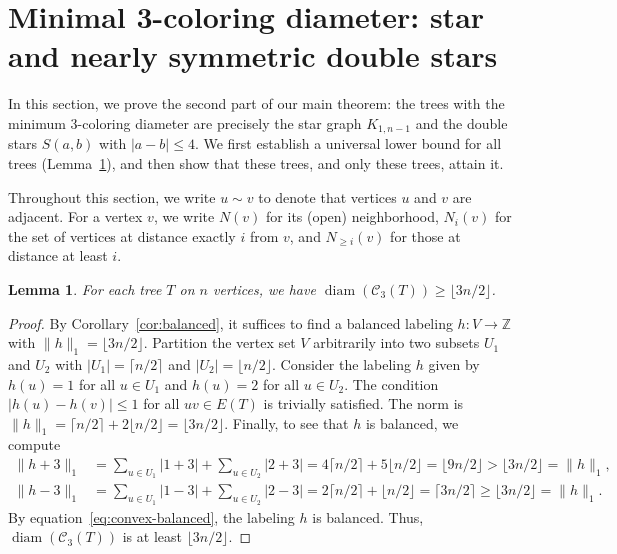 \documentclass[12pt,reqno]{amsart}
\newtheorem{lem}[thm]{Lemma}
\theoremstyle{definition}
\newcommand{\C}{\mathcal{C}}
\newcommand{\Z}{\mathbb{Z}}
\newcommand{\diam}{\operatorname{diam}}
\begin{document}
\section{Minimal 3-coloring diameter: star and nearly symmetric double stars}\label{sec:minimum-3-coloring-diameter}

In this section, we prove the second part of our main theorem: the trees with the minimum 3-coloring diameter are precisely the star graph $K_{1, n-1}$ and the double stars $S(a, b)$ with $|a-b| \le 4$. We first establish a universal lower bound for all trees (Lemma~\ref{lem:universal-lower-bound}), and then show that these trees, and only these trees, attain it.

Throughout this section, we write $u\sim v$ to denote that vertices $u$ and $v$ are adjacent. For a vertex $v$, we write $N(v)$ for its (open) neighborhood, 
$N_i(v)$ for the set of vertices at distance exactly $i$ from $v$, 
and $N_{\ge i}(v)$ for those at distance at least $i$.
 

\begin{lem}\label{lem:universal-lower-bound}
For each tree $T$ on $n$ vertices, we have $\diam(\C_3(T))\geq \lfloor 3n/2\rfloor$.
\end{lem}

\begin{proof} By Corollary~\ref{cor:balanced}, it suffices to find a balanced labeling $h\colon V\to \Z$ with $\|h\|_1 = \lfloor 3n/2\rfloor$. Partition the vertex set $V$ arbitrarily into two subsets $U_1$ and $U_2$ with $|U_1|=\lceil n/2 \rceil$ and $|U_2|=\lfloor n/2 \rfloor$. Consider the labeling $h$ given by $h(u)=1$ for all $u\in U_1$ and $h(u)=2$ for all $u\in U_2$. The condition $|h(u)-h(v)|\leq 1$ for all $uv\in E(T)$ is trivially satisfied. The norm is $\|h\|_1=\lceil n/2\rceil + 2 \lfloor n/2\rfloor = \lfloor 3n/2\rfloor$. Finally, to see that $h$ is balanced, we compute
\begin{align*}
\|h+3\|_1 &= \sum_{u\in U_1} |1+3| + \sum_{u\in U_2} |2+3| = 4\lceil n/2\rceil + 5\lfloor n/2\rfloor = \lfloor 9n/2 \rfloor > \lfloor 3n/2\rfloor = \|h\|_1,  \\ 
\|h-3\|_1 &= \sum_{u\in U_1} |1-3| + \sum_{u\in U_2} |2-3|= 2\lceil n/2\rceil + \lfloor n/2 \rfloor = \lceil 3n/2 \rceil \geq \lfloor 3n/2\rfloor = \|h\|_1.
\end{align*}
By equation~\eqref{eq:convex-balanced}, the labeling $h$ is balanced. Thus, $\diam(\C_3(T))$ is at least $\lfloor 3n/2\rfloor$.
\end{proof}
\end{document}
